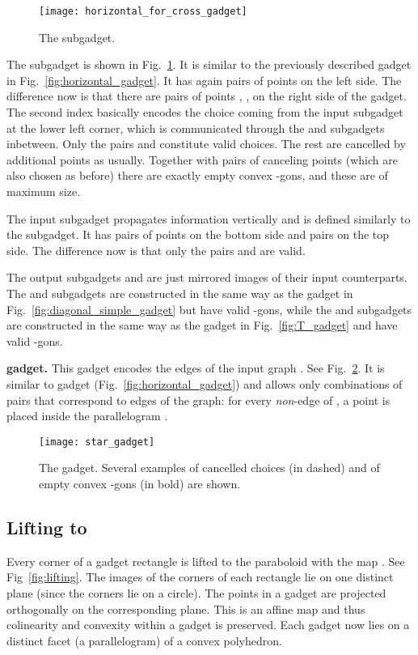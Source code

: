 \documentclass[11pt,a4paper]{article}
\begin{document}
\begin{figure}[h]
\centering
	\texttt{[image: horizontal\_for\_cross\_gadget]}
	\caption[]{The  subgadget.}
	\label{fig:horizontal_for_cross_gadget}
\end{figure}

The  subgadget is shown in Fig.~\ref{fig:horizontal_for_cross_gadget}. It is similar to the previously described  gadget in Fig.~\ref{fig:horizontal_gadget}. It has again  pairs of points  on the left side. The difference now is that there are  pairs of points , , on the right side of the gadget. The second index  basically encodes the choice coming from the input subgadget  at the lower left corner, which is communicated through the  and  subgadgets inbetween. Only the  pairs  and  constitute valid choices. The rest are cancelled by additional points as usually. Together with pairs of canceling points (which are also chosen as before) there are exactly  empty convex -gons, and these are of maximum size.

The input  subgadget propagates information vertically and is defined similarly to the  subgadget. It has  pairs of points  on the bottom side and  pairs  on the top side. The difference now is that only the  pairs  and  are valid.



The output subgadgets  and  are just mirrored images of their input counterparts. The  and  subgadgets are constructed in the same way as the  gadget in Fig.~\ref{fig:diagonal_simple_gadget} but have  valid -gons, while the  and  subgadgets are constructed in the same way as the  gadget in Fig.~\ref{fig:T_gadget} and have  valid -gons. 

\medskip
\noindent
{ \textbf{gadget.}} This gadget encodes the edges of the input graph . See Fig.~\ref{fig:star_gadget}. It is similar to gadget  (Fig.~\ref{fig:horizontal_gadget}) and allows only combinations of pairs that correspond to edges of the graph: for every \emph{non}-edge  of , a point is placed inside the parallelogram . 


\begin{figure}[h]
\centering
	\texttt{[image: star\_gadget]}
	\caption{The  gadget. Several examples of cancelled choices (in dashed) and of empty convex -gons (in bold) are shown.}
	\label{fig:star_gadget}
\end{figure}

\subsection{Lifting to }
Every corner of a gadget rectangle is lifted to the paraboloid with the map . See Fig~\ref{fig:lifting}. The images of the corners of each rectangle lie on one distinct plane (since the corners lie on a circle). The points in a gadget are projected orthogonally on the corresponding plane. This is an affine map and thus colinearity and convexity within a gadget is preserved. Each gadget now lies on a distinct facet (a parallelogram) of a convex polyhedron.
\end{document}
